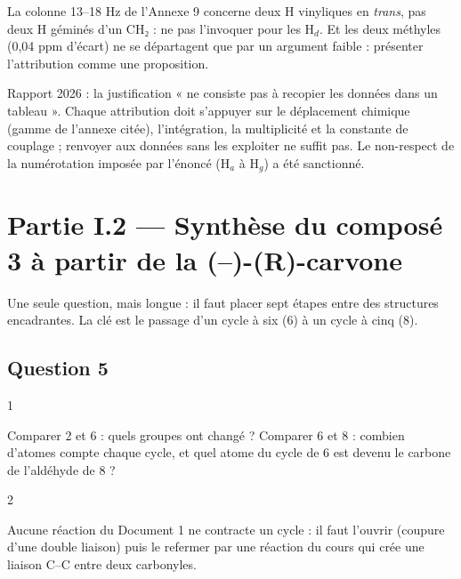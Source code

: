 \documentclass[11pt,a4paper]{article}
\begin{document}
\begin{piege}

La colonne 13--18 Hz de l'Annexe 9 concerne deux H vinyliques en \emph{trans}, pas deux H géminés d'un CH₂ : ne pas l'invoquer pour les H\(_d\). Et les deux méthyles (0,04 ppm d'écart) ne se départagent que par un argument faible : présenter l'attribution comme une proposition.

\end{piege}

\begin{jury}

Rapport 2026 : la justification « ne consiste pas à recopier les données dans un tableau ». Chaque attribution doit s'appuyer sur le déplacement chimique (gamme de l'annexe citée), l'intégration, la multiplicité et la constante de couplage ; renvoyer aux données sans les exploiter ne suffit pas. Le non-respect de la numérotation imposée par l'énoncé (H\(_a\) à H\(_g\)) a été sanctionné.

\end{jury}

\hypertarget{partie-i.2-synthuxe8se-du-composuxe9-3-uxe0-partir-de-la--r-carvone}{%
\section{Partie I.2 --- Synthèse du composé 3 à partir de la (--)-(R)-carvone}\label{partie-i.2-synthuxe8se-du-composuxe9-3-uxe0-partir-de-la--r-carvone}}

Une seule question, mais longue : il faut placer sept étapes entre des structures encadrantes. La clé est le passage d'un cycle à six (6) à un cycle à cinq (8).

\hypertarget{question-5}{%
\subsection{Question 5}\label{question-5}}

\begin{indication}{1}

Comparer 2 et 6 : quels groupes ont changé ? Comparer 6 et 8 : combien d'atomes compte chaque cycle, et quel atome du cycle de 6 est devenu le carbone de l'aldéhyde de 8 ?

\end{indication}

\begin{indication}{2}

Aucune réaction du Document 1 ne contracte un cycle : il faut l'ouvrir (coupure d'une double liaison) puis le refermer par une réaction du cours qui crée une liaison C--C entre deux carbonyles.

\end{indication}
\end{document}
